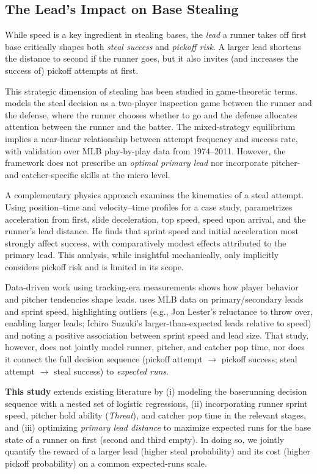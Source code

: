 \documentclass[12pt,letterpaper]{article}
\begin{document}
\subsection{The Lead's Impact on Base Stealing}

While speed is a key ingredient in stealing bases, the \emph{lead} a runner takes off first base critically shapes both \emph{steal success} and \emph{pickoff risk}. A larger lead shortens the distance to second if the runner goes, but it also invites (and increases the success of) pickoff attempts at first.

This strategic dimension of stealing has been studied in game-theoretic terms. \citet{Turocy2014Theft} models the steal decision as a two-player inspection game between the runner and the defense, where the runner chooses whether to go and the defense allocates attention between the runner and the batter. The mixed-strategy equilibrium implies a near-linear relationship between attempt frequency and success rate, with validation over MLB play-by-play data from 1974--2011. However, the framework does not prescribe an \emph{optimal primary lead} nor incorporate pitcher- and catcher-specific skills at the micro level.

A complementary physics approach examines the kinematics of a steal attempt. Using position–time and velocity–time profiles for a case study, \citet{Kagan2013StolenBasePhysics} parametrizes acceleration from first, slide deceleration, top speed, speed upon arrival, and the runner's lead distance. He finds that sprint speed and initial acceleration most strongly affect success, with comparatively modest effects attributed to the primary lead. This analysis, while insightful mechanically, only implicitly considers pickoff risk and is limited in its scope.

Data-driven work using tracking-era measurements shows how player behavior and pitcher tendencies shape leads. \citet{Lindbergh2015Statcast} uses MLB data on primary/secondary leads and sprint speed, highlighting outliers (e.g., Jon Lester's reluctance to throw over, enabling larger leads; Ichiro Suzuki's larger-than-expected leads relative to speed) and noting a positive association between sprint speed and lead size. That study, however, does not jointly model runner, pitcher, and catcher pop time, nor does it connect the full decision sequence (pickoff attempt $\to$ pickoff success; steal attempt $\to$ steal success) to \emph{expected runs}.

\textbf{This study} extends existing literature by (i) modeling the baserunning decision sequence with a nested set of logistic regressions, (ii) incorporating runner sprint speed, pitcher hold ability (\emph{Threat}), and catcher pop time in the relevant stages, and (iii) optimizing \emph{primary lead distance} to maximize expected runs for the base state of a runner on first (second and third empty). In doing so, we jointly quantify the reward of a larger lead (higher steal probability) and its cost (higher pickoff probability) on a common expected-runs scale.
\end{document}

